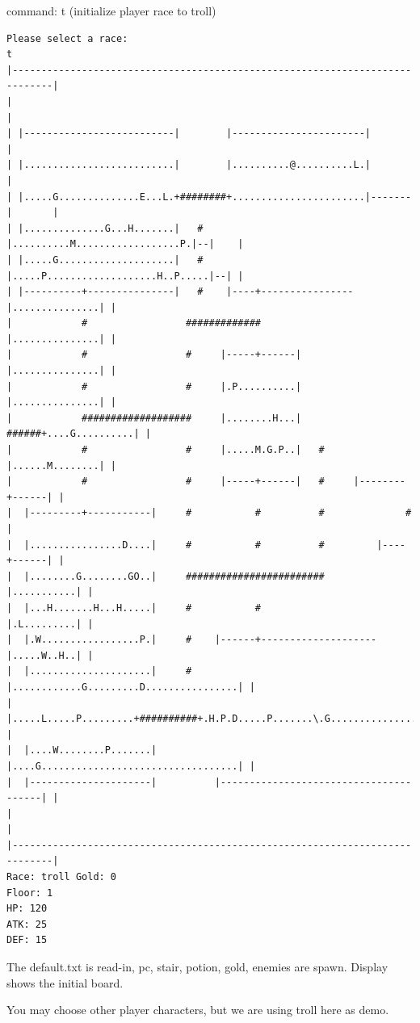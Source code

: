 \documentclass[11pt]{article}
\theoremstyle{plain}
\begin{document}
command: t	(initialize player race to troll)
\begin{Verbatim}[fontsize=\scriptsize]
Please select a race:
t
|-----------------------------------------------------------------------------|
|                                                                             |
| |--------------------------|        |-----------------------|               |
| |..........................|        |..........@..........L.|               |
| |.....G..............E...L.+########+.......................|-------|       |
| |..............G...H.......|   #    |..........M..................P.|--|    |
| |.....G....................|   #    |.....P...................H..P.....|--| |
| |----------+---------------|   #    |----+----------------|...............| |
|            #                 #############                |...............| |
|            #                 #     |-----+------|         |...............| |
|            #                 #     |.P..........|         |...............| |
|            ###################     |........H...|   ######+....G..........| |
|            #                 #     |.....M.G.P..|   #     |......M........| |
|            #                 #     |-----+------|   #     |--------+------| |
|  |---------+-----------|     #           #          #              #        |
|  |................D....|     #           #          #         |----+------| |
|  |........G........GO..|     ########################         |...........| |
|  |...H.......H...H.....|     #           #                    |.L.........| |
|  |.W.................P.|     #    |------+--------------------|.....W..H..| |
|  |.....................|     #    |............G.........D................| |
|  |.....L.....P.........+##########+.H.P.D.....P.......\.G.................| |
|  |....W........P.......|          |....G..................................| |
|  |---------------------|          |---------------------------------------| |
|                                                                             |
|-----------------------------------------------------------------------------|
Race: troll Gold: 0                                                    Floor: 1
HP: 120
ATK: 25
DEF: 15
\end{Verbatim}

The default.txt is read-in, pc, stair, potion, gold, enemies are spawn.
Display shows the initial board.

You may choose other player characters, but we are using troll here as demo.
\end{document}
